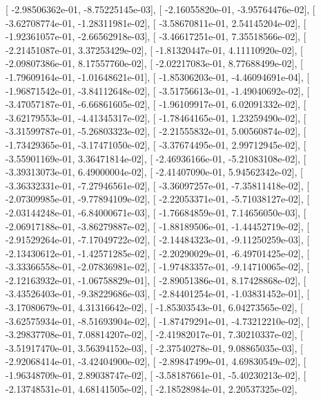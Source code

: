 \documentclass{article}
\begin{document}
       [ -2.98506362e-01,  -8.75225145e-03],
       [ -2.16055820e-01,  -3.95764476e-02],
       [ -3.62708774e-01,  -1.28311981e-02],
       [ -3.58670811e-01,   2.54145204e-02],
       [ -1.92361057e-01,  -2.66562918e-03],
       [ -3.46617251e-01,   7.35518566e-02],
       [ -2.21451087e-01,   3.37253429e-02],
       [ -1.81320447e-01,   4.11110920e-02],
       [ -2.09807386e-01,   8.17557760e-02],
       [ -2.02217083e-01,   8.77688499e-02],
       [ -1.79609164e-01,  -1.01648621e-01],
       [ -1.85306203e-01,  -4.46094691e-04],
       [ -1.96871542e-01,  -3.84112648e-02],
       [ -3.51756613e-01,  -1.49040692e-02],
       [ -3.47057187e-01,  -6.66861605e-02],
       [ -1.96109917e-01,   6.02091332e-02],
       [ -3.62179553e-01,  -4.41345317e-02],
       [ -1.78464165e-01,   1.23259490e-02],
       [ -3.31599787e-01,  -5.26803323e-02],
       [ -2.21555832e-01,   5.00560874e-02],
       [ -1.73429365e-01,  -3.17471050e-02],
       [ -3.37674495e-01,   2.99712945e-02],
       [ -3.55901169e-01,   3.36471814e-02],
       [ -2.46936166e-01,  -5.21083108e-02],
       [ -3.39313073e-01,   6.49000004e-02],
       [ -2.41407090e-01,   5.94562342e-02],
       [ -3.36332331e-01,  -7.27946561e-02],
       [ -3.36097257e-01,  -7.35811418e-02],
       [ -2.07309985e-01,  -9.77894109e-02],
       [ -2.22053371e-01,  -5.71038127e-02],
       [ -2.03144248e-01,  -6.84000671e-03],
       [ -1.76684859e-01,   7.14656050e-03],
       [ -2.06917188e-01,  -3.86279887e-02],
       [ -1.88189506e-01,  -1.44452719e-02],
       [ -2.91529264e-01,  -7.17049722e-02],
       [ -2.14484323e-01,  -9.11250259e-03],
       [ -2.13430612e-01,  -1.42571285e-02],
       [ -2.20290029e-01,  -6.49701425e-02],
       [ -3.33366558e-01,  -2.07836981e-02],
       [ -1.97483357e-01,  -9.14710065e-02],
       [ -2.12163932e-01,  -1.06758829e-01],
       [ -2.89051386e-01,   8.17428868e-02],
       [ -3.43526403e-01,  -9.38229686e-03],
       [ -2.84401254e-01,  -1.03831452e-01],
       [ -3.17080679e-01,   4.31316642e-02],
       [ -1.85303543e-01,   6.04273565e-02],
       [ -3.62575934e-01,  -8.51693904e-02],
       [ -1.87479291e-01,  -4.73212210e-02],
       [ -3.29837708e-01,   7.08814207e-02],
       [ -2.41982017e-01,   7.30210337e-02],
       [ -3.51917470e-01,   3.56394152e-03],
       [ -2.37540278e-01,   9.08865035e-03],
       [ -2.92068414e-01,  -3.42404900e-02],
       [ -2.89847499e-01,   4.69830549e-02],
       [ -1.96348709e-01,   2.89038747e-02],
       [ -3.58187661e-01,  -5.40230213e-02],
       [ -2.13748531e-01,   4.68141505e-02],
       [ -2.18528984e-01,   2.20537325e-02],
\end{document}
